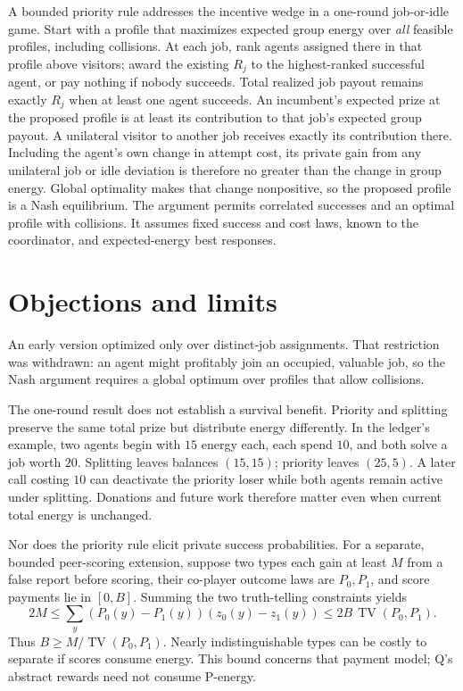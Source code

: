 \documentclass{article}
\begin{document}
A bounded priority rule addresses the incentive wedge in a one-round job-or-idle game. Start with a profile that maximizes expected group energy over \emph{all} feasible profiles, including collisions. At each job, rank agents assigned there in that profile above visitors; award the existing \(R_j\) to the highest-ranked successful agent, or pay nothing if nobody succeeds. Total realized job payout remains exactly \(R_j\) when at least one agent succeeds. An incumbent's expected prize at the proposed profile is at least its contribution to that job's expected group payout. A unilateral visitor to another job receives exactly its contribution there. Including the agent's own change in attempt cost, its private gain from any unilateral job or idle deviation is therefore no greater than the change in group energy. Global optimality makes that change nonpositive, so the proposed profile is a Nash equilibrium. The argument permits correlated successes and an optimal profile with collisions. It assumes fixed success and cost laws, known to the coordinator, and expected-energy best responses. 

\section*{Objections and limits}

An early version optimized only over distinct-job assignments. That restriction was withdrawn: an agent might profitably join an occupied, valuable job, so the Nash argument requires a global optimum over profiles that allow collisions. 

The one-round result does not establish a survival benefit. Priority and splitting preserve the same total prize but distribute energy differently. In the ledger's example, two agents begin with \(15\) energy each, each spend \(10\), and both solve a job worth \(20\). Splitting leaves balances \((15,15)\); priority leaves \((25,5)\). A later call costing \(10\) can deactivate the priority loser while both agents remain active under splitting. Donations and future work therefore matter even when current total energy is unchanged. 

Nor does the priority rule elicit private success probabilities. For a separate, bounded peer-scoring extension, suppose two types each gain at least \(M\) from a false report before scoring, their co-player outcome laws are \(P_0,P_1\), and score payments lie in \([0,B]\). Summing the two truth-telling constraints yields
\[
2M
\leq \sum_y(P_0(y)-P_1(y))(z_0(y)-z_1(y))
\leq 2B\,\operatorname{TV}(P_0,P_1).
\]
Thus \(B\geq M/\operatorname{TV}(P_0,P_1)\). Nearly indistinguishable types can be costly to separate if scores consume energy. This bound concerns that payment model; Q's abstract rewards need not consume P-energy. 
\end{document}
